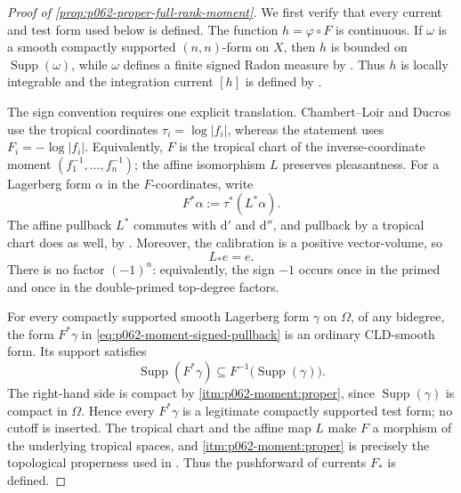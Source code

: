 
\begin{proof}[Proof of
\cref{prop:p062-proper-full-rank-moment}]
We first verify that every current and test form used below is defined.
The function $h=\varphi\circ F$ is continuous.  If $\omega$ is a smooth
compactly supported $(n,n)$-form on $X$, then $h$ is bounded on
$\operatorname{Supp}(\omega)$, while $\omega$ defines a finite signed
Radon measure by \cite[\S\S5.8.5--5.8.6]{CLD25}.  Thus $h$ is locally
integrable and the integration current $[h]$ is defined by
\cite[Corollary~7.2.10]{CLD25}.

The sign convention requires one explicit translation.  Chambert--Loir and
Ducros use the tropical coordinates
$\tau_i=\log|f_i|$, whereas the statement uses $F_i=-\log|f_i|$.
Equivalently, $F$ is the tropical chart of the inverse-coordinate moment
$(f_1^{-1},\ldots,f_n^{-1})$; the affine isomorphism $L$ preserves
pleasantness.
For a Lagerberg form $\alpha$ in the $F$-coordinates, write
\begin{equation}
\label{eq:p062-moment-signed-pullback}
                         F^*\alpha:=\tau^*(L^*\alpha).
\end{equation}
The affine pullback $L^*$ commutes with $\mathrm d'$ and $\mathrm d''$,
and pullback by a tropical chart does as well, by
\cite[\S\S3.3.11--3.3.12]{CLD25}.  Moreover, the calibration is a positive
vector-volume, so
\begin{equation}
\label{eq:p062-moment-sign-calibration}
                           L_*e=e.
\end{equation}
There is no factor $(-1)^n$: equivalently, the sign $-1$ occurs once in
the primed and once in the double-primed top-degree factors.

For every compactly supported smooth Lagerberg form $\gamma$ on $\Omega$,
of any bidegree, the form $F^*\gamma$ in
\eqref{eq:p062-moment-signed-pullback} is an ordinary CLD-smooth form.  Its
support satisfies
\begin{equation}
\label{eq:p062-moment-test-support}
 \operatorname{Supp}(F^*\gamma)
 \subseteq F^{-1}\bigl(\operatorname{Supp}(\gamma)\bigr).
\end{equation}
The right-hand side is compact by
\cref{itm:p062-moment:proper}, since
$\operatorname{Supp}(\gamma)$ is compact in $\Omega$.  Hence every
$F^*\gamma$ is a legitimate compactly supported test form; no cutoff is
inserted.  The tropical chart and the affine map $L$ make $F$ a morphism of
the underlying tropical spaces, and
\cref{itm:p062-moment:proper} is precisely the topological properness used
in \cite[\S7.1.11]{CLD25}.  Thus the pushforward of currents $F_*$ is
defined.


\end{proof}
